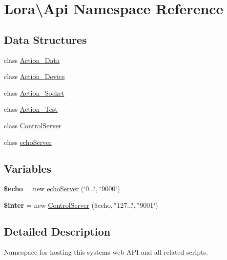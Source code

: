 \hypertarget{namespace_lora_1_1_api}{}\section{Lora\textbackslash{}Api Namespace Reference}
\label{namespace_lora_1_1_api}
\subsection*{Data Structures}
\begin{DoxyCompactItemize}
\item 
class \hyperlink{class_lora_1_1_api_1_1_action___data}{Action\+\_\+\+Data}
\item 
class \hyperlink{class_lora_1_1_api_1_1_action___device}{Action\+\_\+\+Device}
\item 
class \hyperlink{class_lora_1_1_api_1_1_action___socket}{Action\+\_\+\+Socket}
\item 
class \hyperlink{class_lora_1_1_api_1_1_action___test}{Action\+\_\+\+Test}
\item 
class \hyperlink{class_lora_1_1_api_1_1_control_server}{Control\+Server}
\item 
class \hyperlink{class_lora_1_1_api_1_1echo_server}{echo\+Server}
\end{DoxyCompactItemize}
\subsection*{Variables}
\begin{DoxyCompactItemize}
\item 
\mbox{\label{namespace_lora_1_1_api_a76dbdd763137ce9b516dc94d3a16fe60}} 
{\bfseries \$echo} = new \hyperlink{class_lora_1_1_api_1_1echo_server}{echo\+Server} (\char`\"{}0...\char`\"{}, \char`\"{}9000\char`\"{})
\item 
\mbox{\label{namespace_lora_1_1_api_ab515c178ff35f1107f2bc2198e4dee4b}} 
{\bfseries \$inter} = new \hyperlink{class_lora_1_1_api_1_1_control_server}{Control\+Server} (\$echo, \char`\"{}127...\char`\"{}, \char`\"{}9001\char`\"{})
\end{DoxyCompactItemize}


\subsection{Detailed Description}
Namespace for hosting this systems web A\+PI and all related scripts. 